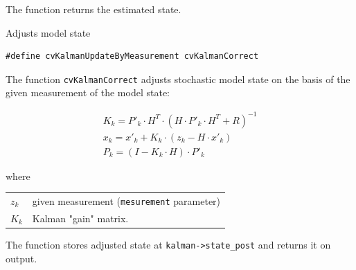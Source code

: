 The function returns the estimated state.

\label{KalmanCorrect}

Adjusts model state


\begin{lstlisting}
#define cvKalmanUpdateByMeasurement cvKalmanCorrect
\end{lstlisting}

\begin{description}
\end{description}

The function \texttt{cvKalmanCorrect} adjusts stochastic model state on the basis of the given measurement of the model state:

\[
\begin{array}{l}
K_k=P'_k \cdot H^T \cdot (H \cdot P'_k \cdot H^T+R)^{-1}\\
x_k=x'_k+K_k \cdot (z_k-H \cdot x'_k)\\
P_k=(I-K_k \cdot H) \cdot P'_k
\end{array}
\]

where

\begin{tabular}{l p{4 in}}
$z_k$ & given measurement (\texttt{mesurement} parameter)\\
$K_k$ & Kalman "gain" matrix.
\end{tabular}

The function stores adjusted state at \texttt{kalman->state\_post} and returns it on output.

